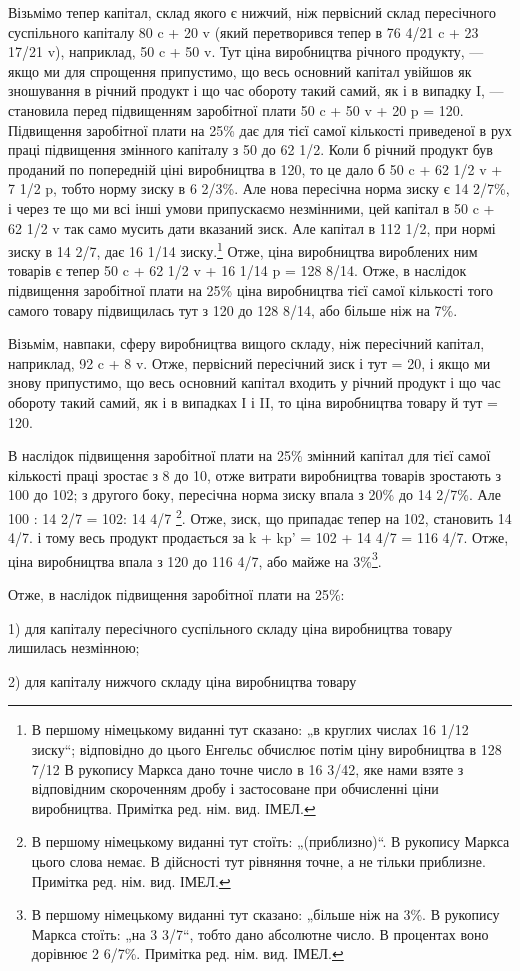 Візьмімо тепер капітал, склад якого є нижчий, ніж первісний
склад пересічного суспільного капіталу 80 c + 20 v (який
перетворився тепер в 76 4/21 c + 23 17/21 v), наприклад, 50 c + 50 v.
Тут ціна виробництва річного продукту, — якщо ми для спрощення
припустимо, що весь основний капітал увійшов як зношування
в річний продукт і що час обороту такий самий, як
і в випадку I, — становила перед підвищенням заробітної плати
50 c + 50 v + 20 p = 120. Підвищення заробітної плати на 25\%
дає для тієї самої кількості приведеної в рух праці підвищення
змінного капіталу з 50 до 62 1/2. Коли б річний продукт був
проданий по попередній ціні виробництва в 120, то це дало б
50 c + 62 1/2 v + 7 1/2 p, тобто норму зиску в 6 2/3\%. Але нова пересічна
норма зиску є 14 2/7\%, і через те що ми всі інші умови
припускаємо незмінними, цей капітал в 50 c + 62 1/2 v так само
мусить дати вказаний зиск. Але капітал в 112 1/2, при нормі зиску
в 14 2/7, дає 16 1/14 зиску.\footnote*{
В першому німецькому виданні тут сказано: „в круглих числах 16 1/12
зиску“; відповідно до цього Енгельс обчислює потім ціну виробництва в 128 7/12
В рукопису Маркса дано точне число в 16 3/42, яке нами взяте з відповідним
скороченням дробу і застосоване при обчисленні ціни виробництва. Примітка
ред. нім. вид. ІМЕЛ.
} Отже, ціна виробництва вироблених
ним товарів є тепер 50 c + 62 1/2 v + 16 1/14 p = 128 8/14. Отже, в наслідок
підвищення заробітної плати на 25\% ціна виробництва
тієї самої кількості того самого товару підвищилась тут з 120
до 128 8/14, або більше ніж на 7\%.

Візьмім, навпаки, сферу виробництва вищого складу, ніж пересічний
капітал, наприклад, 92 c + 8 v. Отже, первісний пересічний
зиск і тут = 20, і якщо ми знову припустимо, що весь
основний капітал входить у річний продукт і що час обороту
такий самий, як і в випадках І і II, то ціна виробництва товару
й тут = 120.

В наслідок підвищення заробітної плати на 25\% змінний капітал
для тієї самої кількості праці зростає з 8 до 10, отже
витрати виробництва товарів зростають з 100 до 102; з другого
боку, пересічна норма зиску впала з 20\% до 14 2/7\%. Але
100 : 14 2/7 = 102: 14 4/7 \footnote*{
В першому німецькому виданні тут стоїть: „(приблизно)“. В рукопису
Маркса цього слова немає. В дійсності тут рівняння точне, а не тільки приблизне.
Примітка ред. нім. вид. ІМЕЛ.
}. Отже, зиск, що припадає тепер на 102,
становить 14 4/7. і тому весь продукт продається за k + kp' =
102 + 14 4/7 = 116 4/7. Отже, ціна виробництва впала з 120 до
116 4/7, або майже на 3\%\footnote*{
В першому німецькому виданні тут сказано: „більше ніж на 3\%. В рукопису
Маркса стоїть: „на 3 3/7“, тобто дано абсолютне число. В процентах воно
дорівнює 2 6/7\%. Примітка ред. нім. вид. ІМЕЛ.
}.

Отже, в наслідок підвищення заробітної плати на 25\%:

1) для капіталу пересічного суспільного складу ціна виробництва
товару лишилась незмінною;

2) для капіталу нижчого складу ціна виробництва товару
\parbreak{}  %
